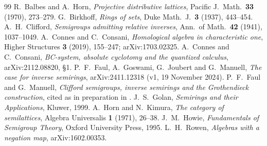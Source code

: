\documentclass[11pt]{amsart}
\theoremstyle{remark}
\begin{document}
\begin{thebibliography}{99}
 R.~Balbes and A.~Horn, \emph{Projective distributive lattices}, Pacific J.\ Math.\ \textbf{33} (1970), 273--279.
 G.~Birkhoff, \emph{Rings of sets}, Duke Math.\ J.\ \textbf{3} (1937), 443--454.
 A.~H.~Clifford, \emph{Semigroups admitting relative inverses}, Ann.\ of Math.\ \textbf{42} (1941), 1037--1049.
 A.~Connes and C.~Consani, \emph{Homological algebra in characteristic one}, Higher Structures \textbf{3} (2019), 155--247; arXiv:1703.02325.
 A.~Connes and C.~Consani, \emph{BC-system, absolute cyclotomy and the quantized calculus}, arXiv:2112.08820, \S1.
 P.~F.~Faul, A.~Goswami, G.~Joubert and G.~Manuell, \emph{The case for inverse semirings}, arXiv:2411.12318 (v1, 19 November 2024).
 P.~F.~Faul and G.~Manuell, \emph{Clifford semigroups, inverse semirings and the Grothendieck construction}, cited as in preparation in \cite{FGJM}.
 J.~S.~Golan, \emph{Semirings and their Applications}, Kluwer, 1999.
 A.~Horn and N.~Kimura, \emph{The category of semilattices}, Algebra Universalis \textbf{1} (1971), 26--38.
 J.~M.~Howie, \emph{Fundamentals of Semigroup Theory}, Oxford University Press, 1995.
 L.~H.~Rowen, \emph{Algebras with a negation map}, arXiv:1602.00353.
\end{thebibliography}
\end{document}
